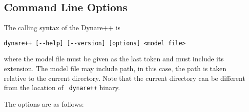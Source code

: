 \documentclass[10pt]{article}
\begin{document}
\subsection{Command Line Options}
\label{dynpp_opts}

The calling syntax of the Dynare++ is

{\small
\begin{verbatim}
dynare++ [--help] [--version] [options] <model file>
\end{verbatim}
}

\noindent where the model file must be given as the last token and
must include its extension. The model file may include path, in this
case, the path is taken relative to the current directory. Note that
the current directory can be different from the location of {\tt
dynare++} binary.

The options are as follows:

\def\desc#1{\rlap{#1}\kern4cm}
\end{document}
